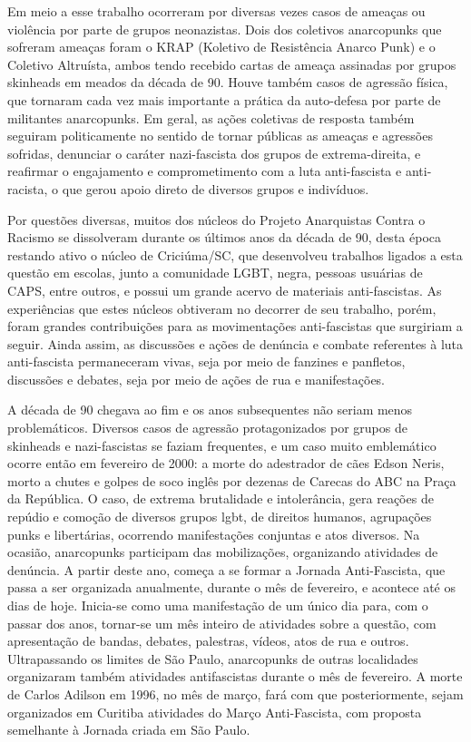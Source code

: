 Em meio a esse trabalho ocorreram por diversas vezes casos de ameaças ou violência por parte de grupos neonazistas. Dois dos coletivos anarcopunks que sofreram ameaças foram o KRAP (Koletivo de Resistência Anarco Punk) e o Coletivo Altruísta, ambos tendo recebido cartas de ameaça assinadas por grupos skinheads em meados da década de 90. Houve também casos de agressão física, que tornaram cada vez mais importante a prática da auto-defesa por parte de militantes anarcopunks. Em geral, as ações coletivas de resposta também seguiram politicamente no sentido de tornar públicas as ameaças e agressões sofridas, denunciar o caráter nazi-fascista dos grupos de extrema-direita, e reafirmar o engajamento e comprometimento com a luta anti-fascista e anti-racista, o que gerou apoio direto de diversos grupos e indivíduos.

Por questões diversas, muitos dos núcleos do Projeto Anarquistas Contra o Racismo se dissolveram durante os últimos anos da década de 90, desta época restando ativo o núcleo de Criciúma/SC, que desenvolveu trabalhos ligados a esta questão em escolas, junto a comunidade LGBT, negra, pessoas usuárias de CAPS, entre outros, e possui um grande acervo de materiais anti-fascistas. As experiências que estes núcleos obtiveram no decorrer de seu trabalho, porém, foram grandes contribuições para as movimentações anti-fascistas que surgiriam a seguir. Ainda assim, as discussões e ações de denúncia e combate referentes à luta anti-fascista permaneceram vivas, seja por meio de fanzines e panfletos, discussões e debates, seja por meio de ações de rua e manifestações.

A década de 90 chegava ao fim e os anos subsequentes não seriam menos problemáticos. Diversos casos de agressão protagonizados por grupos de skinheads e nazi-fascistas se faziam frequentes, e um caso muito emblemático ocorre então em fevereiro de 2000: a morte do adestrador de cães Edson Neris, morto a chutes e golpes de soco inglês por dezenas de Carecas do ABC na Praça da República. O caso, de extrema brutalidade e intolerância, gera reações de repúdio e comoção de diversos grupos lgbt, de direitos humanos, agrupações punks e libertárias, ocorrendo manifestações conjuntas e atos diversos. Na ocasião, anarcopunks participam das mobilizações, organizando atividades de denúncia. A partir deste ano, começa a se formar a Jornada Anti-Fascista, que passa a ser organizada anualmente, durante o mês de fevereiro, e acontece até os dias de hoje. Inicia-se como uma manifestação de um único dia para, com o passar dos anos, tornar-se um mês inteiro de atividades sobre a questão, com apresentação de bandas, debates, palestras, vídeos, atos de rua e outros. Ultrapassando os limites de São Paulo, anarcopunks de outras localidades organizaram também atividades antifascistas durante o mês de fevereiro. A morte de Carlos Adilson em 1996, no mês de março, fará com que posteriormente, sejam organizados em Curitiba atividades do Março Anti-Fascista, com proposta semelhante à Jornada criada em São Paulo.

